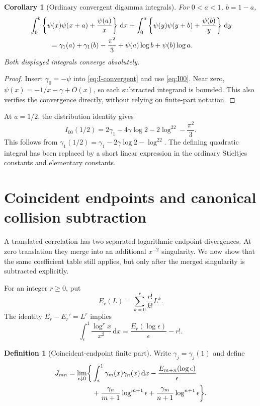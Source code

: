 \documentclass[11pt]{article}
\numberwithin{equation}{section}
\newtheorem{corollary}[theorem]{Corollary}
\theoremstyle{definition}
\newtheorem{definition}[theorem]{Definition}
\theoremstyle{remark}
\newcommand{\dd}{\,\mathrm d}
\begin{document}
\begin{corollary}[Ordinary convergent digamma integrals]
\label{cor:digamma}
For $0<a<1$, $b=1-a$,
\begin{align}
 &\int_0^b\left\{\psi(x)\psi(x+a)+\frac{\psi(a)}x\right\}\dd x
 +\int_0^a\left\{\psi(y)\psi(y+b)+\frac{\psi(b)}y\right\}\dd y\notag\\
 &\hspace{10mm}=\gamma_1(a)+\gamma_1(b)-\frac{\pi^2}{3}
                       +\psi(a)\log b+\psi(b)\log a.
 \label{eq:digamma-convergent}
\end{align}
Both displayed integrals converge absolutely.
\end{corollary}
\begin{proof}
Insert $\gamma_0=-\psi$ into \eqref{eq:I-convergent} and use
\eqref{eq:I00}. Near zero, $\psi(x)=-1/x-\gamma+O(x)$, so each
subtracted integrand is bounded. This also verifies the convergence
directly, without relying on finite-part notation.
\end{proof}

At $a=1/2$, the distribution identity gives
\[
 I_{00}(1/2)=2\gamma_1-4\gamma\log2-2\log^22-\frac{\pi^2}{3}.
\]
This follows from $\gamma_1(1/2)=\gamma_1-2\gamma\log2-\log^22$.
The defining quadratic integral has been replaced by a short linear
expression in the ordinary Stieltjes constants and elementary constants.

\section{Coincident endpoints and canonical collision subtraction}
\label{sec:coincident}

A translated correlation has two separated logarithmic endpoint
divergences. At zero translation they merge into an additional
$x^{-2}$ singularity. We now show that the same coefficient table still
applies, but only after the merged singularity is subtracted explicitly.

For an integer $r\ge0$, put
\begin{equation}
 E_r(L)=\sum_{k=0}^r\frac{r!}{k!}L^k.
 \label{eq:E-polynomial}
\end{equation}
The identity $E_r-E_r'=L^r$ implies
\begin{equation}
 \int_\epsilon^1\frac{\log^r x}{x^2}\dd x
 =\frac{E_r(\log\epsilon)}{\epsilon}-r!.
 \label{eq:double-endpoint}
\end{equation}

\begin{definition}[Coincident-endpoint finite part]
\label{def:J}
Write $\gamma_j=\gamma_j(1)$ and define
\begin{align}
 J_{mn}=\lim_{\epsilon\downarrow0}\biggl\{
 &\int_\epsilon^1\gamma_m(x)\gamma_n(x)\dd x
       -\frac{E_{m+n}(\log\epsilon)}\epsilon\notag\\
 &+\frac{\gamma_n}{m+1}\log^{m+1}\epsilon
       +\frac{\gamma_m}{n+1}\log^{n+1}\epsilon\biggr\}.
 \label{eq:J-cutoff}
\end{align}
\end{definition}
\end{document}
